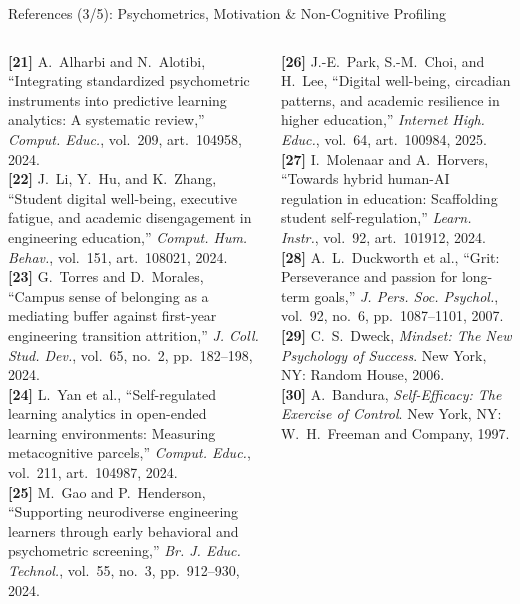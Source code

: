 \documentclass{beamer}
\begin{document}
\begin{frame}[t]{References (3/5): Psychometrics, Motivation \& Non-Cognitive Profiling}
  \begin{columns}[T]
    \fontsize{5.2pt}{6.4pt}\selectfont
    \textbf{[21]} A.~Alharbi and N.~Alotibi, ``Integrating standardized psychometric instruments into predictive learning analytics: A systematic review,'' \textit{Comput. Educ.}, vol.~209, art.~104958, 2024.\\[4pt]
    \textbf{[22]} J.~Li, Y.~Hu, and K.~Zhang, ``Student digital well-being, executive fatigue, and academic disengagement in engineering education,'' \textit{Comput. Hum. Behav.}, vol.~151, art.~108021, 2024.\\[4pt]
    \textbf{[23]} G.~Torres and D.~Morales, ``Campus sense of belonging as a mediating buffer against first-year engineering transition attrition,'' \textit{J. Coll. Stud. Dev.}, vol.~65, no.~2, pp.~182--198, 2024.\\[4pt]
    \textbf{[24]} L.~Yan et al., ``Self-regulated learning analytics in open-ended learning environments: Measuring metacognitive parcels,'' \textit{Comput. Educ.}, vol.~211, art.~104987, 2024.\\[4pt]
    \textbf{[25]} M.~Gao and P.~Henderson, ``Supporting neurodiverse engineering learners through early behavioral and psychometric screening,'' \textit{Br. J. Educ. Technol.}, vol.~55, no.~3, pp.~912--930, 2024.

    \fontsize{5.2pt}{6.4pt}\selectfont
    \textbf{[26]} J.-E.~Park, S.-M.~Choi, and H.~Lee, ``Digital well-being, circadian patterns, and academic resilience in higher education,'' \textit{Internet High. Educ.}, vol.~64, art.~100984, 2025.\\[4pt]
    \textbf{[27]} I.~Molenaar and A.~Horvers, ``Towards hybrid human-AI regulation in education: Scaffolding student self-regulation,'' \textit{Learn. Instr.}, vol.~92, art.~101912, 2024.\\[4pt]
    \textbf{[28]} A.~L.~Duckworth et al., ``Grit: Perseverance and passion for long-term goals,'' \textit{J. Pers. Soc. Psychol.}, vol.~92, no.~6, pp.~1087--1101, 2007.\\[4pt]
    \textbf{[29]} C.~S.~Dweck, \textit{Mindset: The New Psychology of Success}. New York, NY: Random House, 2006.\\[4pt]
    \textbf{[30]} A.~Bandura, \textit{Self-Efficacy: The Exercise of Control}. New York, NY: W.~H.~Freeman and Company, 1997.
  \end{columns}
\end{frame}
\end{document}
